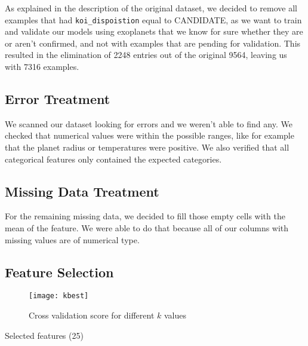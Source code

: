 As explained in the description of the original dataset, we decided to remove all examples
that had \texttt{koi\_dispoistion} equal to CANDIDATE, as we want to train and validate our
models using exoplanets that we know for sure whether they are or aren't confirmed, and not
with examples that are pending for validation. This resulted in the elimination of 2248 entries
out of the original 9564, leaving us with 7316 examples.

\subsection{Error Treatment}

We scanned our dataset looking for errors and we weren't able to find any. We checked
that numerical values were within the possible ranges, like for example that the
planet radius or temperatures were positive. We also verified that all categorical 
features only contained the expected categories.

\subsection{Missing Data Treatment}

For the remaining missing data, we decided to fill those empty cells with the mean
of the feature. We were able to do that because all of our columns with missing values
are of numerical type.

\subsection{Feature Selection}%
\label{sub:feature_removal}



\begin{figure}[H]
    \centering
    \texttt{[image: kbest]}
    \caption{Cross validation score for different $k$ values}%
    \label{fig:feature_cross}
\end{figure}

\begin{table}[H]
    \centering
    \caption{Selected features (25)}%
    \label{tab:features}
    
\end{table}